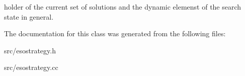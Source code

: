 holder of the current set of solutions and the dynamic elemenst of the search state in general. 

The documentation for this class was generated from the following files\-:\begin{DoxyCompactItemize}
\item 
src/esostrategy.\-h\item 
src/esostrategy.\-cc\end{DoxyCompactItemize}
